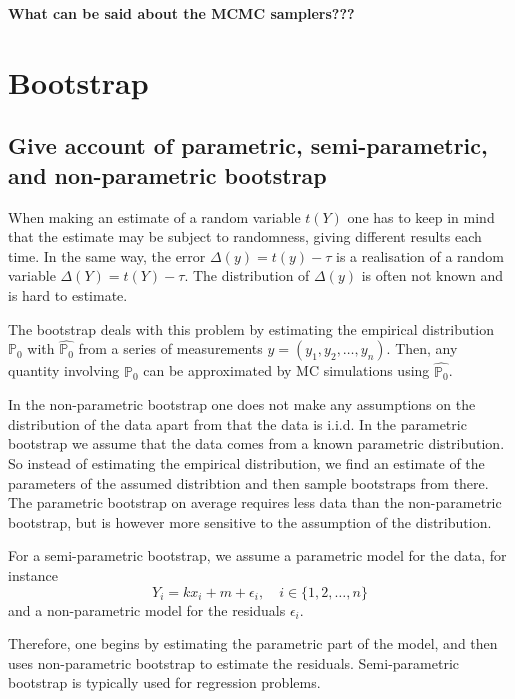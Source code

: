 \documentclass[a4paper]{article}
\begin{document}
\textbf{What can be said about the MCMC samplers???}

\newpage

\section{Bootstrap}

\subsection[Bootstrap]{Give account of parametric, semi-parametric, and non-parametric bootstrap}

When making an estimate of a random variable $t(Y)$ one has to keep in mind that the estimate may be subject to randomness, giving different results each time. In the same way, the error $\Delta(y) = t(y)-\tau$ is a realisation of a random variable $\Delta(Y) = t(Y) - \tau$. The distribution of $\Delta(y)$ is often not known and is hard to estimate. 

The bootstrap deals with this problem by estimating the empirical distribution $\mathbb{P}_0$ with $\hat{\mathbb{P}_0}$ from a series of measurements $y = (y_1, y_2,\dots,y_n)$. Then, any quantity involving $\mathbb{P}_0$ can be approximated by MC simulations using $\hat{\mathbb{P}_0}$.

In the non-parametric bootstrap one does not make any assumptions on the distribution of the data apart from that the data is i.i.d. In the parametric bootstrap we assume that the data comes from a known parametric distribution. So instead of estimating the empirical distribution, we find an estimate of the parameters of the assumed distribtion and then sample bootstraps from there. The parametric bootstrap on average requires less data than the non-parametric bootstrap, but is however more sensitive to the assumption of the distribution.

For a semi-parametric bootstrap, we assume a parametric model for the data, for instance
\begin{equation}
    Y_i = kx_i + m + \epsilon_i, \quad i\in\{1,2,\dots,n\}
\end{equation}
and a non-parametric model for the residuals $\epsilon_i$.

Therefore, one begins by estimating the parametric part of the model, and then uses non-parametric bootstrap to estimate the residuals. Semi-parametric bootstrap is typically used for regression problems.
\end{document}

